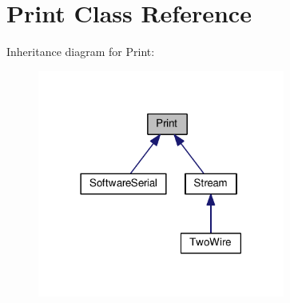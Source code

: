 \hypertarget{class_print}{}\section{Print Class Reference}
\label{class_print}


Inheritance diagram for Print\+:\nopagebreak
\begin{figure}[H]
\begin{center}
\leavevmode
\includegraphics[width=230pt]{class_print__inherit__graph}
\end{center}
\end{figure}
